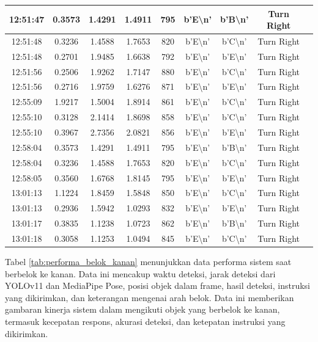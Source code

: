 \begin{table}[H]
\begin{tabular}{|c|c|c|c|c|c|c|c|c|}
    12:51:47 & 0.3573 & 1.4291 & 1.4911 & 795 & b'E\textbackslash n' & b'B\textbackslash n' & Turn Right \\ \hline
    12:51:48 & 0.3236 & 1.4588 & 1.7653 & 820 & b'E\textbackslash n' & b'C\textbackslash n' & Turn Right \\ \hline
    12:51:48 & 0.2701 & 1.9485 & 1.6638 & 792 & b'E\textbackslash n' & b'E\textbackslash n' & Turn Right \\ \hline
    12:51:56 & 0.2506 & 1.9262 & 1.7147 & 880 & b'E\textbackslash n' & b'C\textbackslash n' & Turn Right \\ \hline
    12:51:56 & 0.2716 & 1.9759 & 1.6276 & 871 & b'E\textbackslash n' & b'E\textbackslash n' & Turn Right \\ \hline
    12:55:09 & 1.9217 & 1.5004 & 1.8914 & 861 & b'E\textbackslash n' & b'C\textbackslash n' & Turn Right \\ \hline
    12:55:10 & 0.3128 & 2.1414 & 1.8698 & 858 & b'E\textbackslash n' & b'C\textbackslash n' & Turn Right \\ \hline
    12:55:10 & 0.3967 & 2.7356 & 2.0821 & 856 & b'E\textbackslash n' & b'E\textbackslash n' & Turn Right \\ \hline
    12:58:04 & 0.3573 & 1.4291 & 1.4911 & 795 & b'E\textbackslash n' & b'B\textbackslash n' & Turn Right \\ \hline
    12:58:04 & 0.3236 & 1.4588 & 1.7653 & 820 & b'E\textbackslash n' & b'C\textbackslash n' & Turn Right \\ \hline
    12:58:05 & 0.3560 & 1.6768 & 1.8145 & 795 & b'E\textbackslash n' & b'E\textbackslash n' & Turn Right \\ \hline
    13:01:13 & 1.1224 & 1.8459 & 1.5848 & 850 & b'E\textbackslash n' & b'C\textbackslash n' & Turn Right \\ \hline
    13:01:13 & 0.2936 & 1.5942 & 1.0293 & 832 & b'E\textbackslash n' & b'E\textbackslash n' & Turn Right \\ \hline
    13:01:17 & 0.3835 & 1.1238 & 1.0723 & 862 & b'E\textbackslash n' & b'B\textbackslash n' & Turn Right \\ \hline
    13:01:18 & 0.3058 & 1.1253 & 1.0494 & 845 & b'E\textbackslash n' & b'C\textbackslash n' & Turn Right \\ \hline
\end{tabular}
\end{table}

Tabel \ref{tab:performa_belok_kanan} menunjukkan data performa sistem saat berbelok ke kanan. Data ini mencakup waktu deteksi, jarak deteksi dari YOLOv11 dan MediaPipe Pose, posisi objek dalam frame, hasil deteksi, instruksi yang dikirimkan, dan keterangan mengenai arah belok. Data ini memberikan gambaran kinerja sistem dalam mengikuti objek yang berbelok ke kanan, termasuk kecepatan respons, akurasi deteksi, dan ketepatan instruksi yang dikirimkan.

